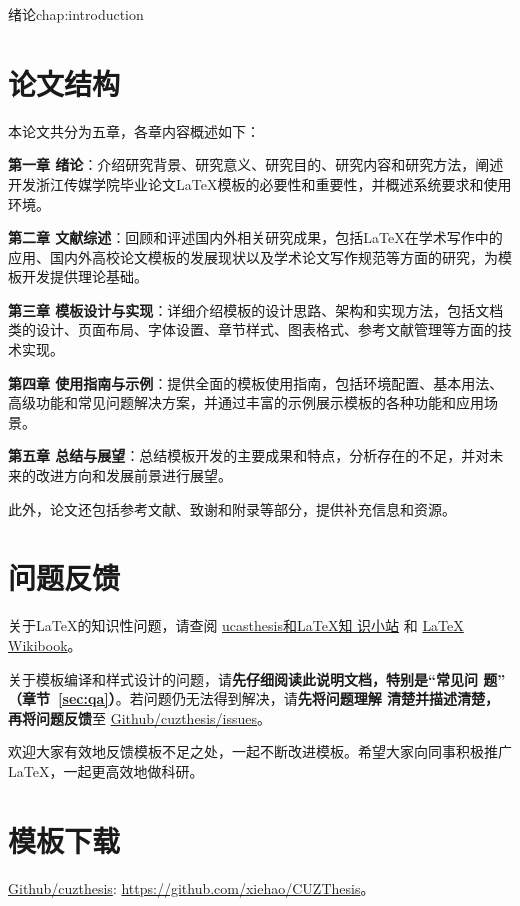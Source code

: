 \begin{cuzchapter}{绪论}{chap:introduction}
	\section{论文结构}\label{sec:structure}

	本论文共分为五章，各章内容概述如下：

	\textbf{第一章 绪论}：介绍研究背景、研究意义、研究目的、研究内容和研究方法，阐述开发浙江传媒学院毕业论文\LaTeX{}模板的必要性和重要性，并概述系统要求和使用环境。

	\textbf{第二章 文献综述}：回顾和评述国内外相关研究成果，包括\LaTeX{}在学术写作中的应用、国内外高校论文模板的发展现状以及学术论文写作规范等方面的研究，为模板开发提供理论基础。

	\textbf{第三章 模板设计与实现}：详细介绍模板的设计思路、架构和实现方法，包括文档类的设计、页面布局、字体设置、章节样式、图表格式、参考文献管理等方面的技术实现。

	\textbf{第四章 使用指南与示例}：提供全面的模板使用指南，包括环境配置、基本用法、高级功能和常见问题解决方案，并通过丰富的示例展示模板的各种功能和应用场景。

	\textbf{第五章 总结与展望}：总结模板开发的主要成果和特点，分析存在的不足，并对未来的改进方向和发展前景进行展望。

	此外，论文还包括参考文献、致谢和附录等部分，提供补充信息和资源。



	\section{问题反馈}\label{sec:callback}

	关于\LaTeX{}的知识性问题，请查阅
	\href{https://github.com/mohuangrui/ucasthesis/wiki}{ucasthesis和\LaTeX{}知
	识小站} 和 \href{https://en.wikibooks.org/wiki/LaTeX}{\LaTeX{} Wikibook}。

	关于模板编译和样式设计的问题，请\textbf{先仔细阅读此说明文档，特别是“常见问
		题” （章节~\ref{sec:qa}）}。若问题仍无法得到解决，请\textbf{先将问题理解
		清楚并描述清楚，再将问题反馈}至
		\href{https://github.com/xiehao/CUZThesis/issues}{Github/cuzthesis/issues}。

	欢迎大家有效地反馈模板不足之处，一起不断改进模板。希望大家向同事积极推广
	\LaTeX{}，一起更高效地做科研。

	\section{模板下载}\label{sec:download}

	\begin{center}
		\href{https://github.com/xiehao/CUZThesis}{Github/cuzthesis}:
		\url{https://github.com/xiehao/CUZThesis}。
	\end{center}

\end{cuzchapter}